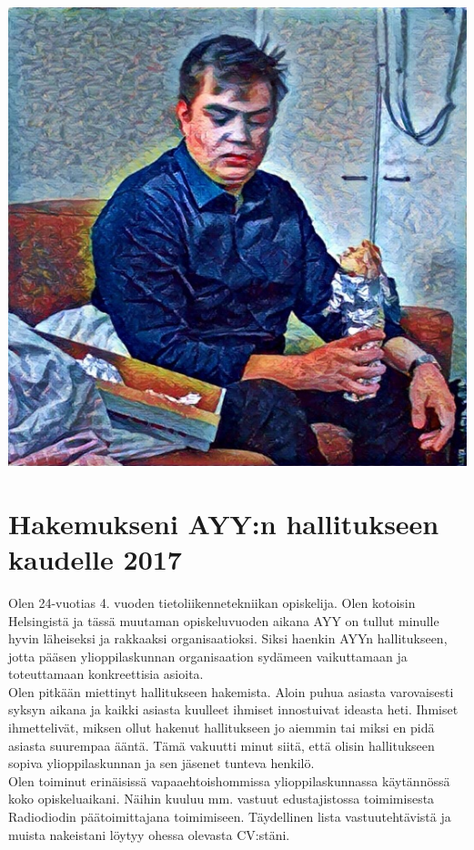 \documentclass[a4paper, 12pt, finnish]{report}
\newcommand{\topic}{Hakemukseni AYY:n hallitukseen kaudelle 2017}
\begin{document}
\includegraphics{Onni.jpg}
\section*{\topic}

Olen 24-vuotias 4. vuoden tietoliikennetekniikan opiskelija.
Olen kotoisin Helsingistä ja tässä muutaman opiskeluvuoden aikana AYY on tullut minulle hyvin läheiseksi ja rakkaaksi organisaatioksi.
Siksi haenkin AYYn hallitukseen, jotta pääsen ylioppilaskunnan organisaation sydämeen vaikuttamaan ja toteuttamaan konkreettisia asioita.\\

Olen pitkään miettinyt hallitukseen hakemista.
Aloin puhua asiasta varovaisesti syksyn aikana ja kaikki asiasta kuulleet ihmiset innostuivat ideasta heti.
Ihmiset ihmettelivät, miksen ollut hakenut hallitukseen jo aiemmin tai miksi en pidä asiasta suurempaa ääntä.
Tämä vakuutti minut siitä, että olisin hallitukseen sopiva ylioppilaskunnan ja sen jäsenet tunteva henkilö.\\

Olen toiminut erinäisissä vapaaehtoishommissa ylioppilaskunnassa käytännössä koko opiskeluaikani.
Näihin kuuluu mm. vastuut edustajistossa toimimisesta Radiodiodin päätoimittajana toimimiseen.
Täydellinen lista vastuutehtävistä ja muista nakeistani löytyy ohessa olevasta CV:stäni.\\
\end{document}
